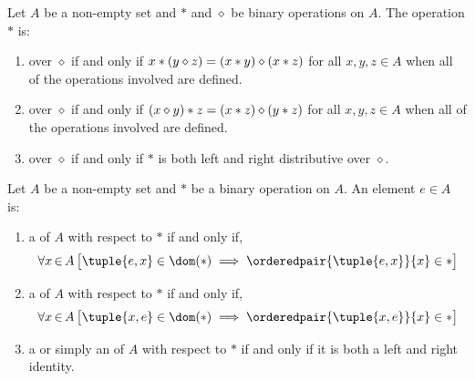 \begin{dfn}[Distributivity]
    \label{dfn:distributivity-of-binary-operations}
    Let \( A \) be a non-empty set and \( \ast \) and \( \diamond \) be binary operations on \( A \). The operation
    \( \ast \) is:
    \begin{enumerate}[topsep=2pt,label=\textup{\texttt{(\alph*)}}]
        \setlength{\itemsep}{0.3em}
        \item {} over \( \diamond \) if and only if
              \( x \ast \mleft( y \diamond z \mright) = \mleft( x \ast y \mright) \diamond \mleft( x \ast z \mright) \)
              for all \( x,y,z \in A \) when all of the operations involved are defined.
        \item {} over \( \diamond \) if and only if
              \( \mleft( x \diamond y \mright) \ast z = \mleft( x \ast z \mright) \diamond \mleft( y \ast z \mright) \)
              for all \( x,y,z \in A \) when all of the operations involved are defined.
        \item {} over \( \diamond \) if and only if \( \ast \) is both left and right distributive
               over \( \diamond \).
    \end{enumerate}
\end{dfn}

\begin{dfn}[Identity]
    \label{dfn:identity-element-of-binary-operations}
    Let \( A \) be a non-empty set and \( \ast \) be a binary operation on \( A \). An element \( e \in A \) is:
    \begin{enumerate}[topsep=2pt,noitemsep,label=\textup{\texttt{(\alph*)}}]
        \item a  of \( A \) with respect to \( \ast \) if and only if,
            \begin{equation*}
                \forall x\,{\in}\,A \, \big[ \tuple{e, x} \in \dom (\ast) \implies \orderedpair{\tuple{e,x}}{x} \in \ast \big]
            \end{equation*}
        \item a  of \( A \) with respect to \( \ast \) if and only if,
            \begin{equation*}
                \forall x\,{\in}\,A \, \big[ \tuple{x, e} \in \dom (\ast) \implies \orderedpair{\tuple{x,e}}{x} \in \ast \big]
            \end{equation*}
        \item a  or simply an  of \( A \) with respect to \( \ast \) if and only if it is both a left and right identity.
    \end{enumerate}
\end{dfn}

